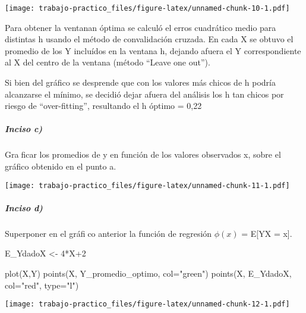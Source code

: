\documentclass[
]{article}
\newenvironment{Shaded}{\begin{snugshade}}{\end{snugshade}}
\newcommand{\AttributeTok}[1]{\textcolor[rgb]{0.77,0.63,0.00}{#1}}
\newcommand{\ConstantTok}[1]{\textcolor[rgb]{0.00,0.00,0.00}{#1}}
\newcommand{\ControlFlowTok}[1]{\textcolor[rgb]{0.13,0.29,0.53}{\textbf{#1}}}
\newcommand{\DecValTok}[1]{\textcolor[rgb]{0.00,0.00,0.81}{#1}}
\newcommand{\FunctionTok}[1]{\textcolor[rgb]{0.00,0.00,0.00}{#1}}
\newcommand{\NormalTok}[1]{#1}
\newcommand{\OtherTok}[1]{\textcolor[rgb]{0.56,0.35,0.01}{#1}}
\newcommand{\SpecialCharTok}[1]{\textcolor[rgb]{0.00,0.00,0.00}{#1}}
\newcommand{\StringTok}[1]{\textcolor[rgb]{0.31,0.60,0.02}{#1}}
\begin{document}
\texttt{[image: trabajo-practico\_files/figure-latex/unnamed-chunk-10-1.pdf]}

Para obtener la ventanan óptima se calculó el erros cuadrático medio
para distintas h usando el método de convalidación cruzada. En cada X se
obtuvo el promedio de los Y incluídos en la ventana h, dejando afuera el
Y correspondiente al X del centro de la ventana (método ``Leave one
out'').

Si bien del gráfico se desprende que con los valores más chicos de h
podría alcanzarse el mínimo, se decidió dejar afuera del análisis los h
tan chicos por riesgo de ``over-fitting'', resultando el h óptimo = 0,22

\hypertarget{inciso-c-1}{%
\subparagraph{Inciso c)}\label{inciso-c-1}}

Graficar los promedios de y en función de los valores observados x,
sobre el gráfico obtenido en el punto a.

\begin{Shaded}
\end{Shaded}

\texttt{[image: trabajo-practico\_files/figure-latex/unnamed-chunk-11-1.pdf]}

\hypertarget{inciso-d-1}{%
\subparagraph{Inciso d)}\label{inciso-d-1}}

Superponer en el gráfico anterior la función de regresión \(\phi(x)\) =
E{[}Y\textbar X = x{]}.

\begin{Shaded}
\begin{Highlighting}[]
\NormalTok{E\_YdadoX }\OtherTok{\textless{}{-}} \DecValTok{4}\SpecialCharTok{*}\NormalTok{X}\SpecialCharTok{+}\DecValTok{2}

\FunctionTok{plot}\NormalTok{(X,Y)}
\FunctionTok{points}\NormalTok{(X, Y\_promedio\_optimo, }\AttributeTok{col=}\StringTok{"green"}\NormalTok{)}
\FunctionTok{points}\NormalTok{(X, E\_YdadoX, }\AttributeTok{col=}\StringTok{"red"}\NormalTok{, }\AttributeTok{type=}\StringTok{"l"}\NormalTok{)}
\end{Highlighting}
\end{Shaded}

\texttt{[image: trabajo-practico\_files/figure-latex/unnamed-chunk-12-1.pdf]}
\end{document}
